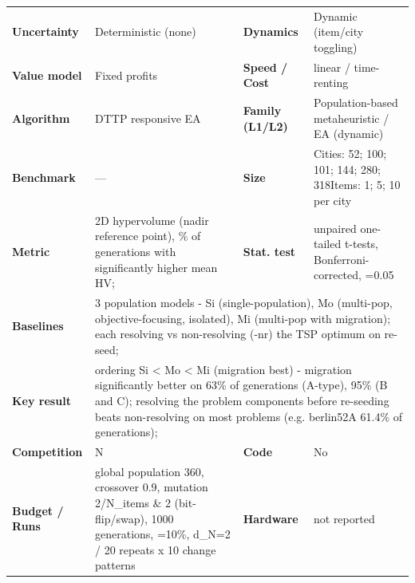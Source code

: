 \documentclass[
  a4paper,
  11pt,
  headings=small,
  numbers=noenddot,
  abstract=on,
  parskip=half,
]{scrartcl}
\begin{document}
\begin{landscape}
\begin{longtable}{@{}p{2.6cm}p{8.7cm}p{2.6cm}p{8.7cm}@{}}
\textbf{Uncertainty} & Deterministic (none) & \textbf{Dynamics} & Dynamic (item/city toggling) \\
\textbf{Value model} & Fixed profits & \textbf{Speed / Cost} & linear / time-renting \\
\textbf{Algorithm} & DTTP responsive EA & \textbf{Family (L1/L2)} & Population-based metaheuristic / EA (dynamic) \\
\textbf{Benchmark} & --- & \textbf{Size} & Cities: 52; 100; 101; 144; 280; 318\newline Items: 1; 5; 10 per city \\
\textbf{Metric} & 2D hypervolume (nadir reference point), \% of generations with significantly higher mean HV; & \textbf{Stat. test} & unpaired one-tailed t-tests, Bonferroni-corrected, =0.05 \\
\textbf{Baselines} & \multicolumn{3}{p{20.0cm}}{3 population models - Si (single-population), Mo (multi-pop, objective-focusing, isolated), Mi (multi-pop with migration); each resolving vs non-resolving (-nr) the TSP optimum on re-seed;} \\
\textbf{Key result} & \multicolumn{3}{p{20.0cm}}{ordering Si < Mo < Mi (migration best) - migration significantly better on 63\% of generations (A-type), 95\% (B and C); resolving the problem components before re-seeding beats non-resolving on most problems (e.g. berlin52A 61.4\% of generations);} \\
\textbf{Competition} & N & \textbf{Code} & No \\
\textbf{Budget / Runs} & global population 360, crossover 0.9, mutation 2/N\_items \& 2 (bit-flip/swap), 1000 generations, =10\%, d\_N=2 / 20 repeats x 10 change patterns & \textbf{Hardware} & not reported \\

\end{longtable}
\end{landscape}
\end{document}
